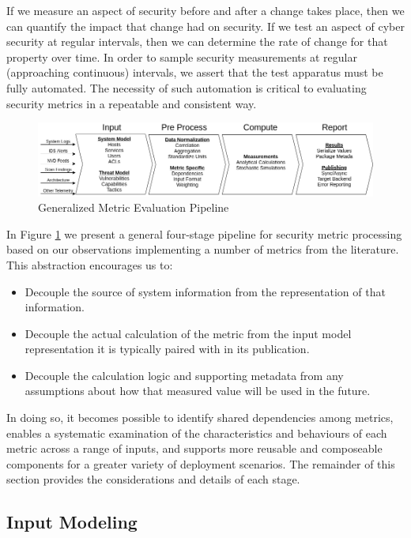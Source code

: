 
If we measure an aspect of security before and after a change takes place, then we can quantify the impact that change had on security. If we test an aspect of cyber security at regular intervals, then we can determine the rate of change for that property over time. In order to sample security measurements at regular (approaching continuous) intervals, we assert that the test apparatus must be fully automated. The necessity of such automation is critical to evaluating security metrics in a repeatable and consistent way. 

\begin{figure}[H]
\centering
\includegraphics[width=\linewidth]{resource/img/ch_intro/metric_calc_pipeline.png}
\caption{Generalized Metric Evaluation Pipeline}
\label{fig:automation:metric_pipeline}
\end{figure} 

In Figure \ref{fig:automation:metric_pipeline} we present a general four-stage pipeline for security metric processing based on our observations implementing a number of metrics from the literature. This abstraction encourages us to:
\begin{itemize}
\item Decouple the source of system information from the representation of that information. 
\item Decouple the actual calculation of the metric from the input model representation it is typically paired with in its publication. 
\item Decouple the calculation logic and supporting metadata from any assumptions about how that measured value will be used in the future. 
\end{itemize}

In doing so, it becomes possible to identify shared dependencies among metrics, enables a systematic examination of the characteristics and behaviours of each metric across a range of inputs, and supports more reusable and composeable components for a greater variety of deployment scenarios. The remainder of this section provides the considerations and details of each stage.

\subsection{Input Modeling}\label{sec:automation:methodology:inputs}

